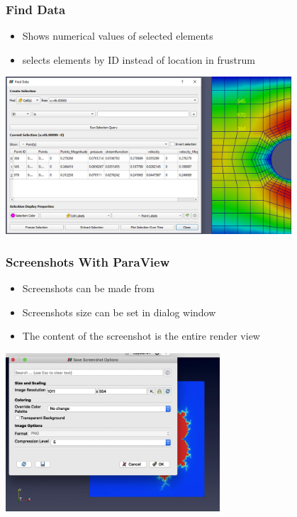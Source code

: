 \begin{frame}
  \frametitle{Find Data}
    \begin{itemize}
      \item Shows numerical values of selected elements
      \item {} selects elements by ID instead of location in frustrum
    \end{itemize}
		\begin{center}
      \includegraphics[width=0.8\textwidth]{screenshots/find-data.png}					
		\end{center}
\end{frame}

\begin{frame}
  \frametitle{Screenshots With ParaView}
    \begin{itemize}
      \item Screenshots can be made from  
      \item Screenshots size can be set in dialog window
      \item The content of the screenshot is the entire render view
    \end{itemize}
		\begin{center}
      \includegraphics[width=0.6\textwidth]{screenshots/screen-dialog.png}
		\end{center}
\end{frame}

